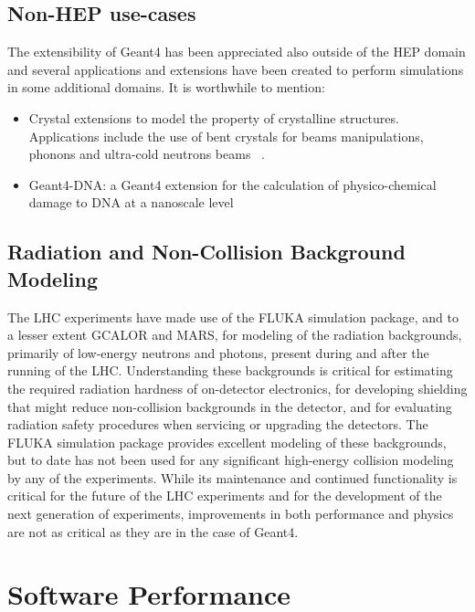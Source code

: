 \documentclass[12pt,a4paper]{article}
\begin{document}
{\hypertarget{non-hep-use-cases}{%
\subsection{Non-HEP use-cases}\label{non-hep-use-cases}}

The extensibility of Geant4 has been appreciated also outside of the HEP
domain and several applications and extensions have been created to
perform simulations in some additional domains. It is worthwhile to
mention:

\begin{itemize}
\item
  Crystal extensions to model the property of crystalline structures.
  Applications include the use of bent crystals for beams manipulations,
  phonons and ultra-cold neutrons beams ~\cite{Brandt:2014imy}.
\item
  Geant4-DNA: a Geant4 extension for the calculation of physico-chemical
  damage to DNA at a nanoscale level ~\cite{bernal:hal-01288764}
\end{itemize}

\hypertarget{radiation-and-non-collision-background-modeling}{%
\subsection{Radiation and Non-Collision Background
Modeling}\label{radiation-and-non-collision-background-modeling}}

The LHC experiments have made use of the FLUKA simulation package, and
to a lesser extent GCALOR and MARS, for modeling of the radiation
backgrounds, primarily of low-energy neutrons and photons, present
during and after the running of the LHC. Understanding these backgrounds
is critical for estimating the required radiation hardness of
on-detector electronics, for developing shielding that might reduce
non-collision backgrounds in the detector, and for evaluating radiation
safety procedures when servicing or upgrading the detectors. The FLUKA
simulation package provides excellent modeling of these backgrounds, but
to date has not been used for any significant high-energy collision
modeling by any of the experiments. While its maintenance and continued
functionality is critical for the future of the LHC experiments and for
the development of the next generation of experiments, improvements in
both performance and physics are not as critical as they are in the case
of Geant4.

\hypertarget{software-performance}{%
\section{Software Performance}\label{software-performance}}

}
\end{document}
